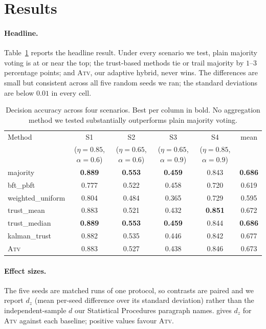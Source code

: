 \documentclass[11pt]{article}
\begin{document}
\section{Results}
\label{sec:results}

\paragraph{Headline.}
Table~\ref{tab:main} reports the headline result. Under every scenario
we test, plain majority voting is at or near the top; the trust-based
methods tie or trail majority by $1$--$3$ percentage points; and
\textsc{Atv}, our adaptive hybrid, never wins. The differences are
small but consistent across all five random seeds we ran; the
standard deviations are below $0.01$ in every cell.

\begin{table}[ht]
\caption{Decision accuracy across four scenarios. Best per column
in bold. No aggregation method we tested substantially outperforms
plain majority voting.}
\label{tab:main}
\centering
\small
\begin{tabular}{lccccc}
\toprule
Method & S1 & S2 & S3 & S4 & mean \\
 & ($\eta{=}0.85$, $\alpha{=}0.6$)
 & ($\eta{=}0.65$, $\alpha{=}0.6$)
 & ($\eta{=}0.65$, $\alpha{=}0.9$)
 & ($\eta{=}0.85$, $\alpha{=}0.9$)
 & \\
\midrule
majority            & \textbf{0.889} & \textbf{0.553} & \textbf{0.459} & 0.843 & \textbf{0.686} \\
bft\_pbft           & 0.777 & 0.522 & 0.458 & 0.720 & 0.619 \\
weighted\_uniform   & 0.804 & 0.484 & 0.365 & 0.729 & 0.595 \\
trust\_mean         & 0.883 & 0.521 & 0.432 & \textbf{0.851} & 0.672 \\
trust\_median       & \textbf{0.889} & \textbf{0.553} & \textbf{0.459} & 0.844 & \textbf{0.686} \\
kalman\_trust       & 0.882 & 0.535 & 0.446 & 0.842 & 0.677 \\
\textsc{Atv}        & 0.883 & 0.527 & 0.438 & 0.846 & 0.673 \\
\bottomrule
\end{tabular}
\end{table}

\paragraph{Effect sizes.}
The five seeds are matched runs of one protocol, so contrasts are paired and
we report $d_z$ (mean per-seed difference over its standard deviation) rather
than the independent-sample $d$ our Statistical Procedures paragraph names.
 gives $d_z$ for \textsc{Atv} against each baseline; positive
values favour \textsc{Atv}.
\end{document}
